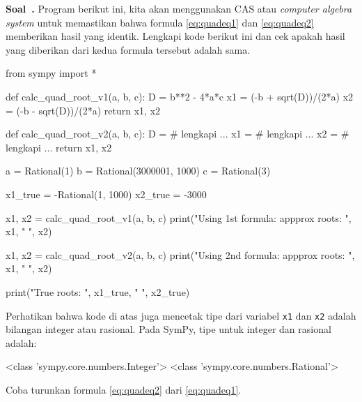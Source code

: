\documentclass[a4paper,11pt,bahasa]{article} %
\newcommand{\txtinline}[1]{\texttt{#1}}
\newcounter{soal}%
\newenvironment{soal}[1][]{\refstepcounter{soal}\par\medskip
   \noindent \textbf{Soal~\thesoal. #1} \sffamily}{\medskip}
\begin{document}
\begin{soal}
Program berikut ini, kita akan menggunakan CAS atau \textit{computer algebra system}
untuk memastikan bahwa formula \eqref{eq:quadeq1} dan \eqref{eq:quadeq2} memberikan
hasil yang identik. Lengkapi kode berikut ini dan cek apakah hasil yang diberikan
dari kedua formula tersebut adalah sama.
\begin{pythoncode}
from sympy import *

def calc_quad_root_v1(a, b, c):
  D = b**2 - 4*a*c
  x1 = (-b + sqrt(D))/(2*a)
  x2 = (-b - sqrt(D))/(2*a)
  return x1, x2
  
def calc_quad_root_v2(a, b, c):
  D = # lengkapi ...
  x1 = # lengkapi ...
  x2 = # lengkapi ... 
  return x1, x2
  
a = Rational(1)
b = Rational(3000001, 1000)
c = Rational(3)
  
x1_true = -Rational(1, 1000)
x2_true = -3000
  
x1, x2 = calc_quad_root_v1(a, b, c)
print("Using 1st formula: appprox roots: ", x1, " ", x2)

x1, x2 = calc_quad_root_v2(a, b, c)
print("Using 2nd formula: appprox roots: ", x1, " ", x2)

print("True roots: ", x1_true, " ", x2_true)
\end{pythoncode}
Perhatikan bahwa kode di atas juga mencetak tipe dari variabel \txtinline{x1} dan
\txtinline{x2} adalah bilangan integer atau rasional.
Pada SymPy, tipe untuk integer dan rasional adalah:
\begin{textcode}
<class 'sympy.core.numbers.Integer'> <class 'sympy.core.numbers.Rational'>
\end{textcode}
Coba turunkan formula \eqref{eq:quadeq2} dari \eqref{eq:quadeq1}.
\end{soal}
\end{document}
